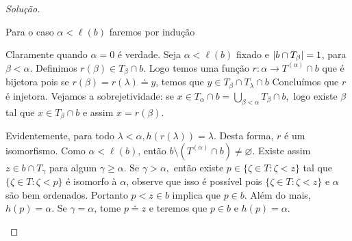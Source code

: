 \documentclass[a4paper]{article}
\begin{document}
\begin{proof}[Solução]
\begin{enumerate}[(i)]
Para o caso \(\alpha<\ell(b)\) faremos por indução%

Claramente quando \(\alpha = 0\) é verdade. Seja \(\alpha < \ell(b)\) fixado e
\(\vert b \cap T_\beta \vert = 1\), para \(\beta < \alpha\).
Definimos \(r(\beta)\in T_\beta\cap b\). Logo temos uma função \(r\colon\alpha\to T^{(\alpha)}\cap b\) que é bijetora
pois se \(r(\beta)=r(\lambda)\doteq y\), temos que \(y\in T_\beta\cap T_\lambda\cap b\)
 Concluímos que \(r\) é injetora. 
Vejamos a sobrejetividade: se \(x\in
T_\alpha\cap b=\bigcup_{\beta<\alpha}T_\beta\cap b,\) logo existe \(\beta\) tal que \(x\in
T_\beta\cap b\) e assim \(x=r(\beta)\).

Evidentemente, para todo \(\lambda<\alpha,h(r(\lambda))=\lambda\). Desta forma, \(r\) é um
isomorfismo. Como \(\alpha<\ell(b)\), então \(b\setminus (T^{(\alpha)}\cap b)\neq\varnothing\).
Existe assim \(z\in b\cap T_\gamma\) para algum \(\gamma\geq\alpha\). Se \(\gamma>\alpha,\)
então existe \(p\in \{\zeta\in T:\zeta<z\}\) tal que \(\{\zeta\in T:\zeta<p\}\) é isomorfo à
\(\alpha\), observe que isso é possível pois \(\{\zeta\in T:\zeta<z\}\) e \(\alpha\) são bem
ordenados. Portanto \(p<z\in b\) implica que \(p\in b\). Além do mais, \(h(p)=\alpha\).
Se \(\gamma=\alpha\), tome \(p\doteq z\) e teremos que \(p\in b\) e \(h(p)=\alpha\).


\par 


\end{enumerate}
\end{proof}
\end{document}
